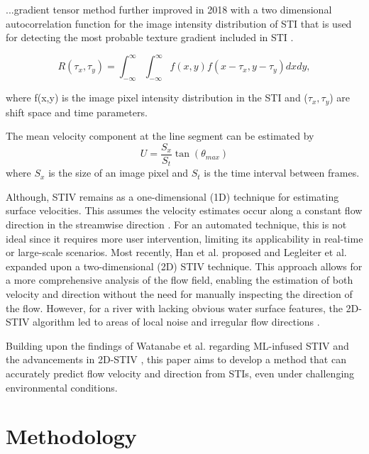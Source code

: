 \documentclass[12pt]{elsarticle}
\begin{document}
...gradient tensor method  further improved in 2018 with a two dimensional autocorrelation function for the image intensity distribution of STI that is used for detecting the most probable texture gradient included in STI \cite{fujita2019efficient}.

\begin{equation}
    R(\tau_x, \tau_y) = \int_{-\infty}^{\infty}\int_{-\infty}^{\infty} f(x, y) f(x - \tau_x, y - \tau_y) dx dy,
\end{equation}

where f(x,y) is the image pixel intensity distribution in the STI and (\(\tau_x, \tau_y\)) are shift space and time parameters.

The mean velocity component at the line segment can be  estimated by
\begin{equation}
    U=\frac{S_x}{S_t}\tan(\theta_{max})
\end{equation}
where $S_x$ is the size of an image pixel and $S_t$ is the time interval between frames. 

Although, STIV remains as a one-dimensional (1D) technique for estimating surface velocities. This assumes the velocity estimates occur along a constant flow direction in the streamwise direction \cite{fujita2019efficient, fujita2020application, fujita2007development,watanabe2021improving}. For an automated technique, this is not ideal since it requires more user intervention, limiting its applicability in real-time or large-scale scenarios. Most recently, Han et al. \cite{han_two-dimensional_2021} proposed  and Legleiter et al. \cite{legleiter2024two} expanded upon a two-dimensional (2D) STIV technique. This approach allows for a more comprehensive analysis of the flow field, enabling the estimation of both velocity and direction without the need for manually inspecting the direction of the flow. However, for a river with lacking obvious water surface features, the 2D-STIV algorithm led to areas of local noise and irregular flow directions \cite{legleiter2024two}.

Building upon the findings of Watanabe et al. \cite{watanabe2021improving} regarding ML-infused STIV and the advancements in 2D-STIV \cite{han_two-dimensional_2021, legleiter2024two}, this paper aims to develop a method that can accurately predict flow velocity and direction from STIs, even under challenging environmental conditions.
\section{Methodology}
\end{document}
